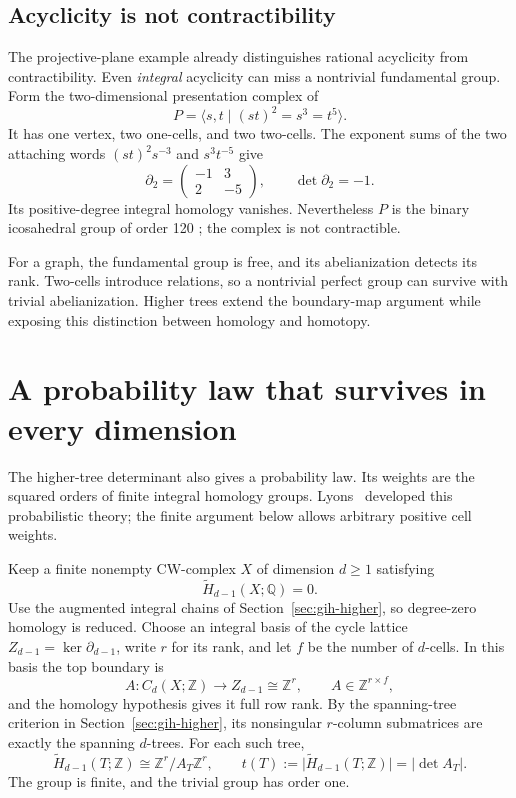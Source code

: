 \documentclass[11pt]{article}
\theoremstyle{definition}
\theoremstyle{remark}
\newcommand{\Q}{\mathbb Q}
\newcommand{\Z}{\mathbb Z}
\newcommand{\R}{\mathbb R}
\newcommand{\C}{\mathbb C}
\begin{document}
\subsection{Acyclicity is not contractibility}

The projective-plane example already distinguishes rational acyclicity
from contractibility.  Even \emph{integral} acyclicity can miss a
nontrivial fundamental group.  Form the two-dimensional presentation
complex of
\[
 P=\langle s,t\mid(st)^2=s^3=t^5\rangle.
\]
It has one vertex, two one-cells, and two two-cells.  The exponent sums
of the two attaching words \((st)^2s^{-3}\) and \(s^3t^{-5}\) give
\[
 \partial_2=
 \begin{pmatrix}-1&3\\2&-5\end{pmatrix},
 \qquad \det\partial_2=-1.
\]
Its positive-degree integral homology vanishes.  Nevertheless \(P\)
is the binary icosahedral group of order 120
\cite{gih-brini-icosahedral}; the complex is not contractible.

For a graph, the fundamental group is free, and its abelianization
detects its rank. Two-cells introduce relations, so a nontrivial perfect
group can survive with trivial abelianization. Higher trees extend the
boundary-map argument while exposing this distinction between homology
and homotopy.


\section{A probability law that survives in every dimension}
\label{hte-section}

The higher-tree determinant also gives a probability law. Its weights are
the squared orders of finite integral homology groups.
Lyons~\cite{hte-lyons-determinantal,hte-lyons-complexes} developed this
probabilistic theory; the finite argument below allows arbitrary positive cell weights.

Keep a finite nonempty CW-complex $X$ of dimension $d\geq1$ satisfying
\[
\widetilde H_{d-1}(X;\Q)=0.
\]
Use the augmented integral chains of Section~\ref{sec:gih-higher}, so
degree-zero homology is reduced. Choose an integral basis of the cycle
lattice $Z_{d-1}=\ker\partial_{d-1}$, write $r$ for its rank, and let $f$
be the number of $d$-cells. In this basis the top boundary is
\[
A:C_d(X;\Z)\longrightarrow Z_{d-1}\cong\Z^r,
\qquad A\in\Z^{r\times f},
\]
and the homology hypothesis gives it full row rank. By the spanning-tree
criterion in Section~\ref{sec:gih-higher}, its nonsingular $r$-column
submatrices are exactly the spanning $d$-trees. For each such tree,
\begin{equation}
\label{hte-torsion-index}
\widetilde H_{d-1}(T;\Z)\cong\Z^r/A_T\Z^r,
\qquad
t(T):=\bigl|\widetilde H_{d-1}(T;\Z)\bigr|=|\det A_T|.
\end{equation}
The group is finite, and the trivial group has order one.
\end{document}
